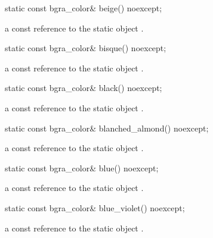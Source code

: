 \begin{itemdecl}
static const bgra_color& beige() noexcept;
\end{itemdecl}
\begin{itemdescr}
\pnum
\returns
a const reference to the static  object .
\end{itemdescr}

\begin{itemdecl}
static const bgra_color& bisque() noexcept;
\end{itemdecl}
\begin{itemdescr}
\pnum
\returns
a const reference to the static  object .
\end{itemdescr}

\begin{itemdecl}
static const bgra_color& black() noexcept;
\end{itemdecl}
\begin{itemdescr}
\pnum
\returns
a const reference to the static  object .
\end{itemdescr}

\begin{itemdecl}
static const bgra_color& blanched_almond() noexcept;
\end{itemdecl}
\begin{itemdescr}
\pnum
\returns
a const reference to the static  object .
\end{itemdescr}

\begin{itemdecl}
static const bgra_color& blue() noexcept;
\end{itemdecl}
\begin{itemdescr}
\pnum
\returns
a const reference to the static  object .
\end{itemdescr}

\begin{itemdecl}
static const bgra_color& blue_violet() noexcept;
\end{itemdecl}
\begin{itemdescr}
\pnum
\returns
a const reference to the static  object .
\end{itemdescr}

